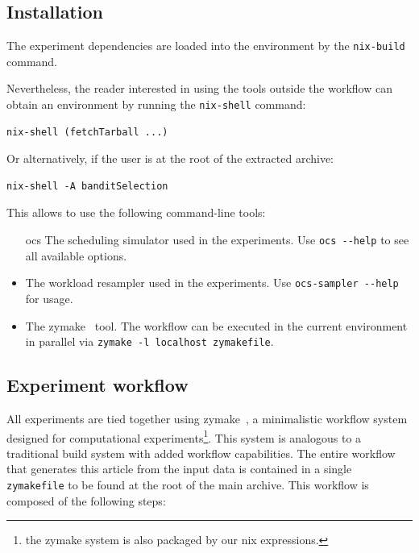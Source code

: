 \documentclass[sigconf,review]{acmart}
\begin{document}
\subsection{Installation}

The experiment dependencies are loaded into the environment by the
\lstinline[basicstyle=\ttfamily]|nix-build| command.

Nevertheless, the reader interested in using the tools outside the workflow can
obtain an environment by running the
\lstinline[basicstyle=\ttfamily]|nix-shell| command:

\begin{lstlisting}
nix-shell (fetchTarball ...)
\end{lstlisting}

Or alternatively, if the user is at the root of the extracted archive:

\begin{lstlisting}
nix-shell -A banditSelection
\end{lstlisting}

This allows to use the following command-line tools:

\begin{itemize}

  \item[ocs] The scheduling simulator used in the experiments. Use
    \lstinline[basicstyle=\ttfamily]|ocs --help| to see all available options.

  \item[ocs-sampler] The workload resampler used in the experiments. Use
    \lstinline[basicstyle=\ttfamily]|ocs-sampler --help| for usage.

  \item[zymake] The zymake~\cite{zymake} tool.
    The workflow can be executed in the current environment in parallel
    via \lstinline[basicstyle=\ttfamily]|zymake -l localhost zymakefile|.

\end{itemize}

\subsection{Experiment workflow}

 All experiments are tied together using zymake~\cite{zymake}, a minimalistic
 workflow system designed for computational experiments\footnote{the zymake system
 is also packaged by our nix expressions.}. This system is
 analogous to a traditional build system with added workflow capabilities. The
 entire workflow that generates this article from the input data is contained
 in a single \lstinline[basicstyle=\ttfamily\color{blue}]|zymakefile| to be
 found at the root of the main archive. This workflow is composed of the
 following steps:
\end{document}
